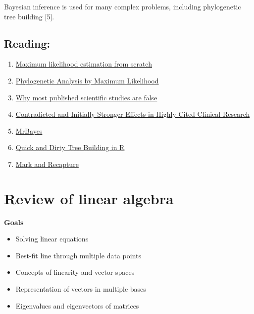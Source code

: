 \documentclass[
  letterpaper,
  DIV=11,
  numbers=noendperiod]{scrreprt}
\providecommand{\tightlist}{%
  \setlength{\itemsep}{0pt}\setlength{\parskip}{0pt}}\usepackage{longtable,booktabs,array}
\begin{document}
Bayesian inference is used for many complex problems, including
phylogenetic tree building {[}5{]}.

\hypertarget{reading}{%
\section{Reading:}\label{reading}}

\begin{enumerate}
\def\labelenumi{\arabic{enumi}.}
\item
  \href{https://www.r-bloggers.com/maximum-likelihood-estimation-from-scratch/}{Maximum
  likelihood estimation from scratch}
\item
  \href{https://academic.oup.com/mbe/article/24/8/1586/1103731}{Phylogenetic
  Analysis by Maximum Likelihood}
\item
  \href{https://journals.plos.org/plosmedicine/article?id=10.1371/journal.pmed.0020124}{Why
  most published scientific studies are false}
\item
  \href{https://jamanetwork.com/journals/jama/fullarticle/201218}{Contradicted
  and Initially Stronger Effects in Highly Cited Clinical Research}
\item
  \href{http://nbisweden.github.io/MrBayes/}{MrBayes}
\item
  \href{https://www.molecularecologist.com/2016/02/quick-and-dirty-tree-building-in-r/}{Quick
  and Dirty Tree Building in R}
\item
  \href{https://en.wikipedia.org/wiki/Mark_and_recapture}{Mark and
  Recapture}
\end{enumerate}


\hypertarget{review-of-linear-algebra}{%
\chapter{Review of linear algebra}\label{review-of-linear-algebra}}

\textbf{Goals}

\begin{itemize}
\tightlist
\item
  Solving linear equations
\item
  Best-fit line through multiple data points
\item
  Concepts of linearity and vector spaces
\item
  Representation of vectors in multiple bases
\item
  Eigenvalues and eigenvectors of matrices
\end{itemize}
\end{document}
